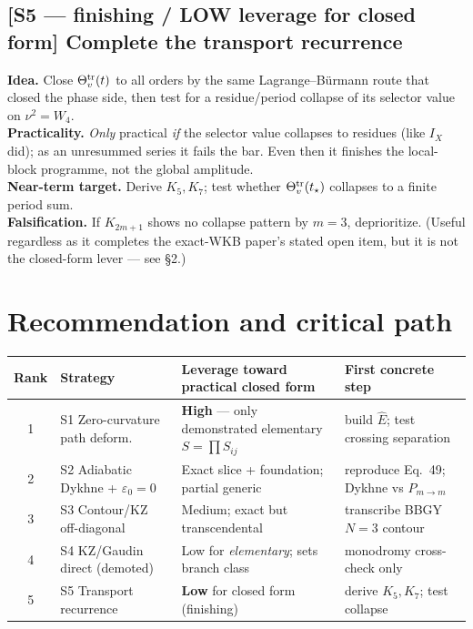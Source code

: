 \documentclass[11pt]{article}
\newcommand{\eps}{\varepsilon}
\newcommand{\Pmid}{P_{m\to m}}
\begin{document}
\subsection*{[S5 --- finishing / LOW leverage for closed form] Complete the transport recurrence}
\textbf{Idea.} Close $\Theta^{\rm tr}_v(t)$ to all orders by the same Lagrange--B\"urmann route
that closed the phase side, then test for a residue/period collapse of its selector value on
$\nu^2=W_4$.\\
\textbf{Practicality.} \emph{Only} practical \emph{if} the selector value collapses to residues
(like $I_X$ did); as an unresummed series it fails the bar. Even then it finishes the
local-block programme, not the global amplitude.\\
\textbf{Near-term target.} Derive $K_5,K_7$; test whether
$\Theta^{\rm tr}_v(t_\star)$ collapses to a finite period sum.\\
\textbf{Falsification.} If $K_{2m+1}$ shows no collapse pattern by $m=3$, deprioritize. (Useful
regardless as it completes the exact-WKB paper's stated open item, but it is not the closed-form
lever --- see \S2.)

\section{Recommendation and critical path}
\begin{table}[h]\centering
\begin{tabular}{@{}clll@{}}
\toprule
Rank & Strategy & Leverage toward practical closed form & First concrete step \\
\midrule
1 & S1 Zero-curvature path deform.\ & \textbf{High} --- only demonstrated elementary $S=\prod S_{ij}$ & build $\hat E$; test crossing separation \\
2 & S2 Adiabatic Dykhne + $\eps_0{=}0$ & Exact slice + foundation; partial generic & reproduce Eq.~49; Dykhne vs $\Pmid$ \\
3 & S3 Contour/KZ off-diagonal & Medium; exact but transcendental & transcribe BBGY $N{=}3$ contour \\
4 & S4 KZ/Gaudin direct (demoted) & Low for \emph{elementary}; sets branch class & monodromy cross-check only \\
5 & S5 Transport recurrence & \textbf{Low} for closed form (finishing) & derive $K_5,K_7$; test collapse \\
\bottomrule
\end{tabular}
\end{table}
\end{document}
